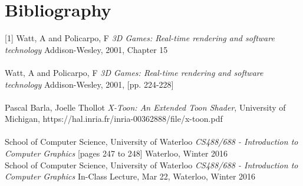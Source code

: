 \documentclass {article}
\begin{document}
\newpage

\section{Bibliography}

[1] Watt, A and Policarpo, F {\it 3D Games: Real-time rendering and software technology} Addison-Wesley, 2001, Chapter 15\\\relax
\\\relax
[2] Watt, A and Policarpo, F {\it 3D Games: Real-time rendering and software technology} Addison-Wesley, 2001, [pp. 224-228]\\\relax
\\\relax
[3] Pascal Barla, Joelle Thollot {\it X-Toon: An Extended Toon Shader}, University of Michigan, https://hal.inria.fr/inria-00362888/file/x-toon.pdf \\\relax
\\\relax
[4] School of Computer Science, University of Waterloo {\it CS488/688 - Introduction to Computer Graphics} [pages 247 to 248] Waterloo, Winter 2016\\\relax \newline
[5] School of Computer Science, University of Waterloo {\it CS488/688 - Introduction to Computer Graphics} In-Class Lecture, Mar 22, Waterloo, Winter 2016

\end{document}

